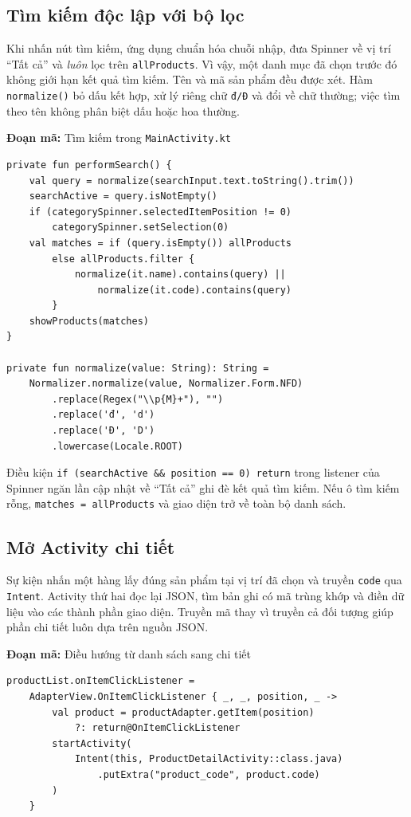 \documentclass[12pt,a4paper]{article}
\newcommand{\codepath}[1]{\nolinkurl{#1}}
\newcommand{\codecaption}[1]{\par\noindent\textbf{Đoạn mã:} #1\par\vspace{3pt}}
\begin{document}
\subsection{Tìm kiếm độc lập với bộ lọc}
Khi nhấn nút tìm kiếm, ứng dụng chuẩn hóa chuỗi nhập, đưa Spinner về vị trí
“Tất cả” và \emph{luôn} lọc trên \texttt{allProducts}. Vì vậy, một danh mục đã
chọn trước đó không giới hạn kết quả tìm kiếm. Tên và mã sản phẩm đều được xét.
Hàm \texttt{normalize()} bỏ dấu kết hợp, xử lý riêng chữ \texttt{đ/Đ} và đổi
về chữ thường; việc tìm theo tên không phân biệt dấu hoặc hoa thường.

\codecaption{Tìm kiếm trong \codepath{MainActivity.kt}}
\begin{Verbatim}[fontsize=\small,breaklines=true,frame=single]
private fun performSearch() {
    val query = normalize(searchInput.text.toString().trim())
    searchActive = query.isNotEmpty()
    if (categorySpinner.selectedItemPosition != 0)
        categorySpinner.setSelection(0)
    val matches = if (query.isEmpty()) allProducts
        else allProducts.filter {
            normalize(it.name).contains(query) ||
                normalize(it.code).contains(query)
        }
    showProducts(matches)
}

private fun normalize(value: String): String =
    Normalizer.normalize(value, Normalizer.Form.NFD)
        .replace(Regex("\\p{M}+"), "")
        .replace('đ', 'd')
        .replace('Đ', 'D')
        .lowercase(Locale.ROOT)
\end{Verbatim}

\noindent Điều kiện \texttt{if (searchActive \&\& position == 0) return} trong
listener của Spinner ngăn lần cập nhật về “Tất cả” ghi đè kết quả tìm kiếm.
Nếu ô tìm kiếm rỗng, \texttt{matches = allProducts} và giao diện trở về toàn bộ danh sách.

\subsection{Mở Activity chi tiết}
Sự kiện nhấn một hàng lấy đúng sản phẩm tại vị trí đã chọn và truyền \texttt{code}
qua \texttt{Intent}. Activity thứ hai đọc lại JSON, tìm bản ghi có mã trùng khớp
và điền dữ liệu vào các thành phần giao diện. Truyền mã thay vì truyền cả đối tượng
giúp phần chi tiết luôn dựa trên nguồn JSON.

\codecaption{Điều hướng từ danh sách sang chi tiết}
\begin{Verbatim}[fontsize=\small,breaklines=true,frame=single]
productList.onItemClickListener =
    AdapterView.OnItemClickListener { _, _, position, _ ->
        val product = productAdapter.getItem(position)
            ?: return@OnItemClickListener
        startActivity(
            Intent(this, ProductDetailActivity::class.java)
                .putExtra("product_code", product.code)
        )
    }
\end{Verbatim}
\end{document}
